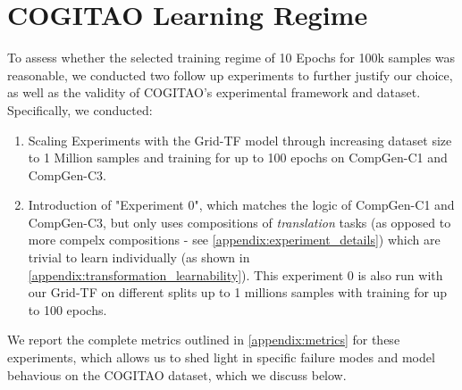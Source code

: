 \section{COGITAO Learning Regime}\label{appendix:cogitao_learning_regime}

To assess whether the selected training regime of 10 Epochs for 100k samples was reasonable, we conducted two follow up experiments to further justify our choice, as well as the validity of COGITAO's experimental framework and dataset. Specifically, we conducted: 

\begin{enumerate}
    \item Scaling Experiments with the Grid-TF model through increasing dataset size to 1 Million samples and training for up to 100 epochs on CompGen-C1 and CompGen-C3. 
    \item Introduction of "Experiment 0", which matches the logic of CompGen-C1 and CompGen-C3, but only uses compositions of \textit{translation} tasks (as opposed to more compelx compositions - see \ref{appendix:experiment_details}) which are trivial to learn individually (as shown in \ref{appendix:transformation_learnability}). This experiment 0 is also run with our Grid-TF on different splits up to 1 millions samples with training for up to 100 epochs.
\end{enumerate}

We report the complete metrics outlined in \ref{appendix:metrics} for these experiments, which allows us to shed light in specific failure modes and model behavious on the COGITAO dataset, which we discuss below. 

